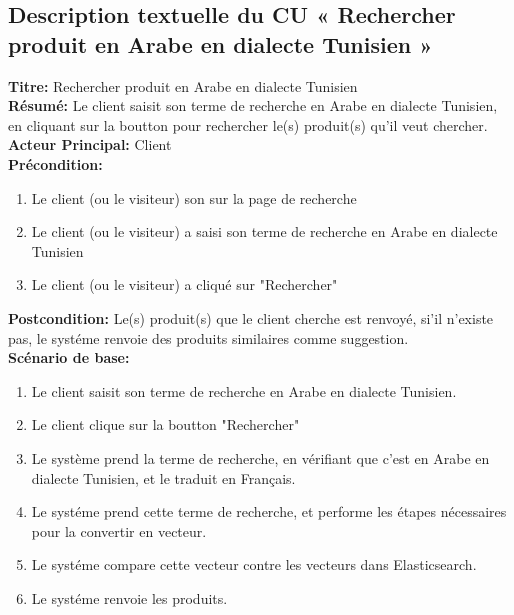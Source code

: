 \subsection{Description textuelle du CU « Rechercher produit en Arabe en dialecte Tunisien »}
\noindent
\textbf{Titre:} Rechercher produit en Arabe en dialecte Tunisien \\
\textbf{Résumé:} Le client saisit son terme de recherche en Arabe en dialecte Tunisien, en cliquant sur la boutton pour rechercher le(s) produit(s) qu'il veut chercher. \\
\textbf{Acteur Principal:} Client \\
\textbf{Précondition:} \begin{enumerate}
	\item Le client (ou le visiteur) son sur la page de recherche
	\item Le client (ou le visiteur) a saisi son terme de recherche en Arabe en dialecte Tunisien
	\item Le client (ou le visiteur) a cliqué sur "Rechercher"
\end{enumerate}
\textbf{Postcondition:} Le(s) produit(s) que le client cherche est renvoyé, si'il n'existe pas, le systéme renvoie des produits similaires comme suggestion. \\
\textbf{Scénario de base: }
\begin{enumerate}
	\item Le client saisit son terme de recherche en Arabe en dialecte Tunisien.
	\item Le client clique sur la boutton "Rechercher"
	\item Le système prend la terme de recherche, en vérifiant que c'est en Arabe en dialecte Tunisien, et le traduit en Français.
	\item Le systéme prend cette terme de recherche, et performe les étapes nécessaires pour la convertir en vecteur.
	\item Le systéme compare cette vecteur contre les vecteurs dans Elasticsearch.
	\item Le systéme renvoie les produits.
\end{enumerate}

